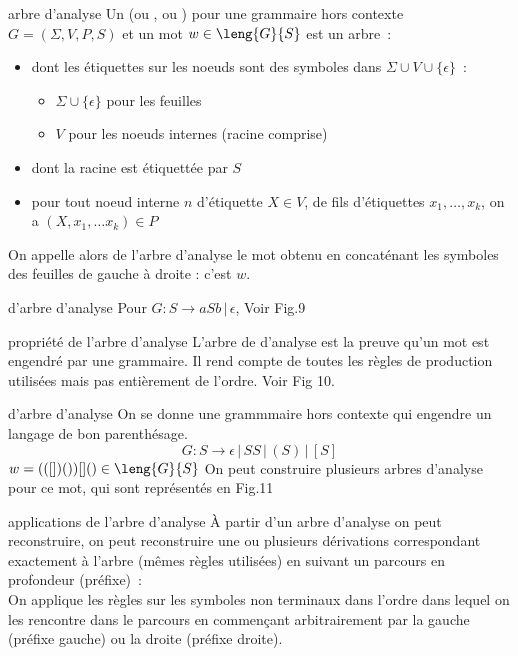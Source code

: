 \begin{adjustwidth}{-3cm}{-3cm}
\begin{definition}{}{arbre d'analyse}
    Un  (ou , ou ) pour une grammaire hors contexte $G = (\Sigma, V,P,S)$ et un mot $w \in \leng{G}{S}$ est un arbre~:
    \begin{itemize}
        \item dont les étiquettes sur les noeuds sont des symboles dans $\Sigma\cup V \cup\{\epsilon\}$~:
        \begin{itemize}
            \item $\Sigma \cup \{\epsilon\}$ pour les feuilles
            \item $V$ pour les noeuds internes (racine comprise)
        \end{itemize}
        \item dont la racine est étiquettée par $S$
        \item pour tout noeud interne $n$ d'étiquette $X \in V$, de fils d'étiquettes $x_1, \dots, x_k$, on a $(X,x_1,\dots x_k) \in P$
    \end{itemize}
    On appelle alors  de l'arbre d'analyse le mot obtenu en concaténant les symboles des feuilles de gauche à droite : c'est $w$.
\end{definition}

\begin{exemple}{}{d'arbre d'analyse}
    Pour $G : S \rightarrow aSb \,\vert\, \epsilon$, Voir Fig.9
\end{exemple}


\begin{remarque}{}{propriété de l'arbre d'analyse}
    L'arbre de d'analyse est la  preuve qu'un mot est engendré par une grammaire. Il rend compte de toutes les règles de production utilisées mais pas entièrement de l'ordre. Voir Fig 10.
\end{remarque}

\begin{exemple}{}{d'arbre d'analyse}
    On se donne une grammmaire hors contexte qui engendre un langage de bon parenthésage.
    $$G : S \rightarrow \epsilon \,\vert\, SS \,\vert\, (S) \,\vert\, [S]$$
    $w = (([])())[]() \in \leng{G}{S}$
    On peut construire plusieurs arbres d'analyse pour ce mot, qui sont représentés en Fig.11
\end{exemple}

\begin{remarque}{}{applications de l'arbre d'analyse}
    À partir d'un arbre d'analyse on peut reconstruire, on peut reconstruire une ou plusieurs dérivations correspondant exactement à l'arbre (mêmes règles utilisées) en suivant un parcours en profondeur (préfixe)~:\\
    On applique les règles sur les symboles non terminaux dans l'ordre dans lequel on les rencontre dans le parcours en commençant arbitrairement par la gauche (préfixe gauche) ou la droite (préfixe droite).
\end{remarque}


\end{adjustwidth}
